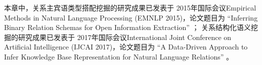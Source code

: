 
本章中，关系主宾语类型搭配挖掘的研究成果已发表于
2015年国际会议Empirical Methods in Natural Language Processing
(EMNLP 2015)，论文题目为
``Inferring Binary Relation Schemas for Open Information Extraction'' ；
关系结构化语义挖掘的研究成果已发表于
2017年国际会议International Joint Conference on Artificial Intelligence
(IJCAI 2017)，论文题目为
``A Data-Driven Approach to Infer Knowledge Base Representation for Natural Language Relations'' 。







% 
% 

